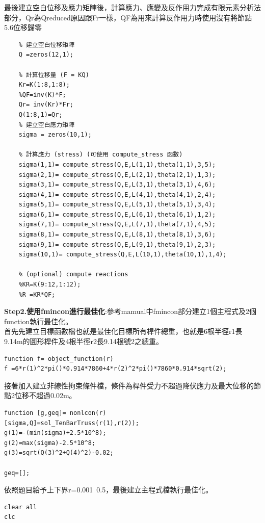 \documentclass[12pt]{article}
\begin{document}
\begin{CJK}{UTF8}{bkai}
最後建立空白位移及應力矩陣後，計算應力、應變及反作用力完成有限元素分析法部分，Qr為Qreduced原因跟Fr一樣，QF為用來計算反作用力時使用沒有將節點5.6位移歸零

\begin{lstlisting}
	% 建立空白位移矩陣
    Q =zeros(12,1);
  
    % 計算位移量 (F = KQ)
    Kr=K(1:8,1:8);
    %QF=inv(K)*F;
    Qr= inv(Kr)*Fr;
    Q(1:8,1)=Qr;
    % 建立空白應力矩陣
    sigma = zeros(10,1);
  
    % 計算應力 (stress) (可使用 compute_stress 函數)
    sigma(1,1)= compute_stress(Q,E,L(1,1),theta(1,1),3,5);
    sigma(2,1)= compute_stress(Q,E,L(2,1),theta(2,1),1,3);
    sigma(3,1)= compute_stress(Q,E,L(3,1),theta(3,1),4,6);
    sigma(4,1)= compute_stress(Q,E,L(4,1),theta(4,1),2,4);
    sigma(5,1)= compute_stress(Q,E,L(5,1),theta(5,1),3,4);
    sigma(6,1)= compute_stress(Q,E,L(6,1),theta(6,1),1,2);
    sigma(7,1)= compute_stress(Q,E,L(7,1),theta(7,1),4,5);
    sigma(8,1)= compute_stress(Q,E,L(8,1),theta(8,1),3,6);
    sigma(9,1)= compute_stress(Q,E,L(9,1),theta(9,1),2,3);
    sigma(10,1)= compute_stress(Q,E,L(10,1),theta(10,1),1,4);

    % (optional) compute reactions
    %KR=K(9:12,1:12);
    %R =KR*QF;
\end{lstlisting}

\textbf{Step2.使用fmincon進行最佳化}:參考mamual中fmincon部分建立1個主程式及2個function執行最佳化。\\

首先先建立目標函數檔也就是最佳化目標所有桿件總重，也就是6根半徑r1長9.14m的圓形桿件及4根半徑r2長9.14根號2之總重。

\begin{lstlisting}
function f= object_function(r)
f =6*r(1)^2*pi()*0.914*7860+4*r(2)^2*pi()*7860*0.914*sqrt(2);
\end{lstlisting}

接著加入建立非線性拘束條件檔，條件為桿件受力不超過降伏應力及最大位移的節點2位移不超過0.02m。
\begin{lstlisting}
function [g,geq]= nonlcon(r)
[sigma,Q]=sol_TenBarTruss(r(1),r(2));
g(1)=-(min(sigma)+2.5*10^8);
g(2)=max(sigma)-2.5*10^8;
g(3)=sqrt(Q(3)^2+Q(4)^2)-0.02;

geq=[];
\end{lstlisting}

依照題目給予上下界r=0.001~0.5，最後建立主程式檔執行最佳化。

\begin{lstlisting}
clear all
clc


\end{lstlisting}
\end{CJK}
\end{document}
